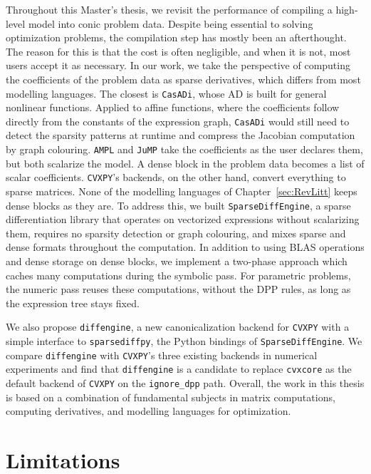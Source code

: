 \label{sec:Conclusion}
\acresetall

Throughout this Master's thesis, we revisit the performance of compiling a high-level
model into conic problem data. Despite being essential to solving optimization problems, the
compilation step has mostly been an afterthought. The reason for this is that the cost is
often negligible, and when it is not, most users accept it as necessary. In our work, we take
the perspective of computing the coefficients of the problem data as sparse derivatives, which
differs from most modelling languages. The closest is \texttt{CasADi}, whose
\ac{AD} is built for general nonlinear functions. Applied to affine functions, where the
coefficients follow directly from the constants of the expression graph, \texttt{CasADi}
would still need to detect the sparsity patterns at runtime and compress the Jacobian
computation by graph colouring.
\texttt{AMPL} and \texttt{JuMP} take the coefficients as the user declares them, but both
scalarize the model. A dense block in the problem data becomes a list of scalar
coefficients. \texttt{CVXPY}'s backends, on the other hand, convert everything to sparse
matrices. None of the modelling languages of Chapter~\ref{sec:RevLitt} keeps dense blocks as
they are.
To address this, we
built \texttt{SparseDiffEngine}, a sparse differentiation library that operates on
vectorized expressions without scalarizing them, requires no sparsity detection or graph
colouring, and mixes sparse and dense formats throughout the computation. In addition to
using \ac{BLAS} operations and dense storage on dense blocks, we implement a two-phase approach
which caches many computations during the symbolic pass. For parametric problems, the
numeric pass reuses these computations, without the \ac{DPP} rules, as long as the expression
tree stays fixed.

We also propose \texttt{diffengine}, a new canonicalization backend for \texttt{CVXPY} with a
simple interface to \texttt{sparsediffpy}, the Python bindings of
\texttt{SparseDiffEngine}. We compare
\texttt{diffengine} with \texttt{CVXPY}'s three existing backends in numerical
experiments and find that \texttt{diffengine} is a candidate to replace \texttt{cvxcore} as
the default backend of \texttt{CVXPY} on the \texttt{ignore\_dpp} path. Overall, the work in this thesis is based on a combination of
fundamental subjects in matrix computations, computing derivatives, and modelling languages
for optimization.

\section{Limitations}\label{sec:Limitations}

